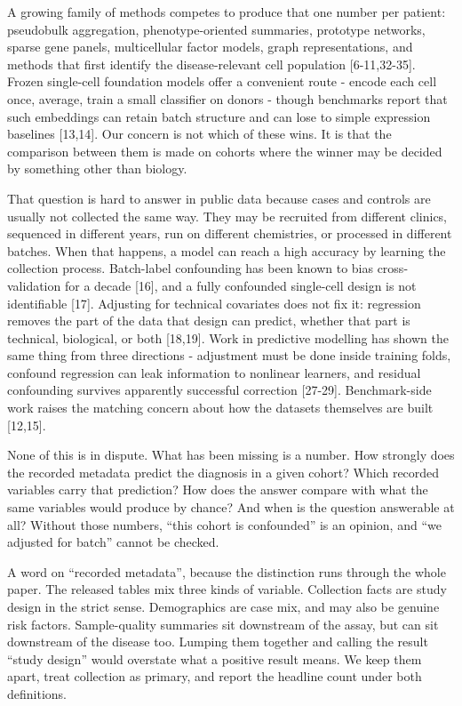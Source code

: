 A growing family of methods competes to produce that one number per patient: pseudobulk aggregation, phenotype-oriented summaries, prototype networks, sparse gene panels, multicellular factor models, graph representations, and methods that first identify the disease-relevant cell population {[}6-11,32-35{]}. Frozen single-cell foundation models offer a convenient route - encode each cell once, average, train a small classifier on donors - though benchmarks report that such embeddings can retain batch structure and can lose to simple expression baselines {[}13,14{]}. Our concern is not which of these wins. It is that the comparison between them is made on cohorts where the winner may be decided by something other than biology.

That question is hard to answer in public data because cases and controls are usually not collected the same way. They may be recruited from different clinics, sequenced in different years, run on different chemistries, or processed in different batches. When that happens, a model can reach a high accuracy by learning the collection process. Batch-label confounding has been known to bias cross-validation for a decade {[}16{]}, and a fully confounded single-cell design is not identifiable {[}17{]}. Adjusting for technical covariates does not fix it: regression removes the part of the data that design can predict, whether that part is technical, biological, or both {[}18,19{]}. Work in predictive modelling has shown the same thing from three directions - adjustment must be done inside training folds, confound regression can leak information to nonlinear learners, and residual confounding survives apparently successful correction {[}27-29{]}. Benchmark-side work raises the matching concern about how the datasets themselves are built {[}12,15{]}.

None of this is in dispute. What has been missing is a number. How strongly does the recorded metadata predict the diagnosis in a given cohort? Which recorded variables carry that prediction? How does the answer compare with what the same variables would produce by chance? And when is the question answerable at all? Without those numbers, ``this cohort is confounded'' is an opinion, and ``we adjusted for batch'' cannot be checked.

A word on ``recorded metadata'', because the distinction runs through the whole paper. The released tables mix three kinds of variable. Collection facts are study design in the strict sense. Demographics are case mix, and may also be genuine risk factors. Sample-quality summaries sit downstream of the assay, but can sit downstream of the disease too. Lumping them together and calling the result ``study design'' would overstate what a positive result means. We keep them apart, treat collection as primary, and report the headline count under both definitions.


